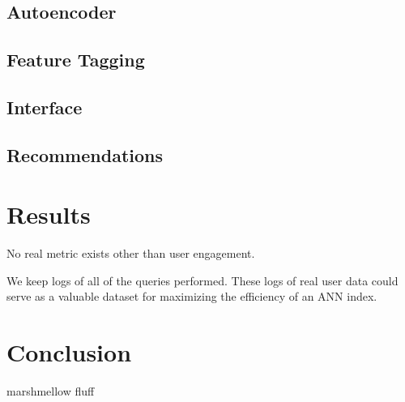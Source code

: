 \documentclass[conference]{IEEEtran}
\begin{document}
\subsection{Autoencoder}

\subsection{Feature Tagging}

\subsection{Interface}

\subsection{Recommendations}


\section{Results}
No real metric exists other than user engagement.

We keep logs of all of the queries performed.  These logs of real user data could serve as a valuable dataset for maximizing the efficiency of an ANN index.

\section{Conclusion}
marshmellow fluff


\raggedright


\end{document}

